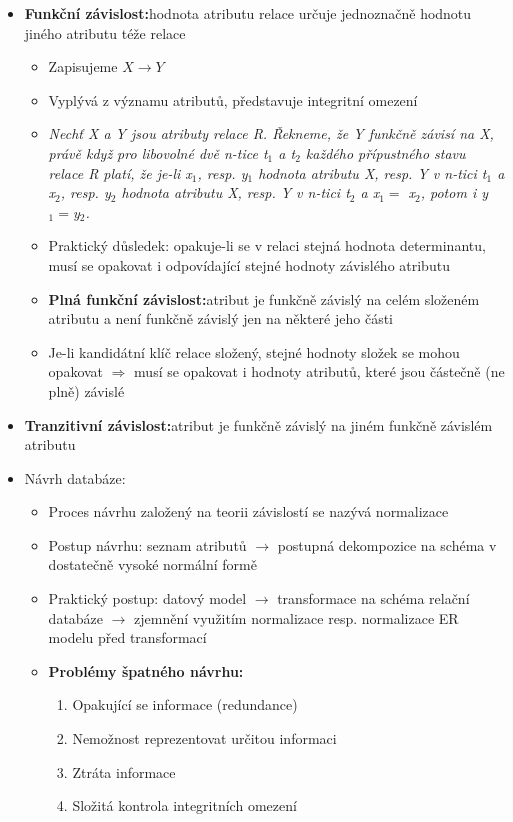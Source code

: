 \documentclass[a4paper,10pt]{article}
\newcommand{\pojem}[2]{\item \textbf{#1:}\quad #2}
\newcommand{\tedy}{$\Rightarrow$ }
\begin{document}
			\begin{itemize}
				\pojem{Funkční závislost}{hodnota atributu relace určuje jednoznačně hodnotu jiného atributu téže relace}
				\begin{itemize}
					\item Zapisujeme $X \rightarrow Y$
					\item Vyplývá z významu atributů, představuje integritní omezení
					\item \emph{Nechť X a Y jsou atributy relace R. Řekneme, že Y funkčně závisí na X, právě když pro libovolné dvě n-tice t$_1$ a t$_2$ každého přípustného stavu relace R platí, že je-li x$_1$, resp. y$_1$ hodnota atributu X, resp. Y v n-tici t$_1$ a x$_2$, resp. y$_2$ hodnota atributu X, resp. Y v n-tici t$_2$ a x$_1 = $ x$_2$, potom i y$_1 = $y$_2$.}
					\item Praktický důsledek: opakuje-li se v relaci stejná hodnota determinantu, musí se opakovat i odpovídající stejné hodnoty závislého atributu

					\pojem{Plná funkční závislost}{atribut je funkčně závislý na celém složeném atributu a není funkčně závislý jen na některé jeho části}
					\item Je-li kandidátní klíč relace složený, stejné hodnoty složek se mohou opakovat \tedy musí se opakovat i hodnoty atributů, které jsou částečně (ne plně) závislé
				\end{itemize}
				\pojem{Tranzitivní závislost}{atribut je funkčně závislý na jiném funkčně závislém atributu}

				\item Návrh databáze:
				\begin{itemize}
					\item Proces návrhu založený na teorii závislostí se nazývá normalizace
					\item Postup návrhu: seznam atributů $\rightarrow$ postupná dekompozice na schéma v dostatečně vysoké normální formě
					\item Praktický postup: datový model $\rightarrow$ transformace na schéma relační databáze $\rightarrow$ zjemnění využitím normalizace resp. normalizace ER modelu před transformací
					\pojem{Problémy špatného návrhu}
					\begin{enumerate}
						\item Opakující se informace (redundance)
						\item Nemožnost reprezentovat určitou informaci
						\item Ztráta informace
						\item Složitá kontrola integritních omezení
					\end{enumerate}
				\end{itemize}	
			\end{itemize}
\end{document}
